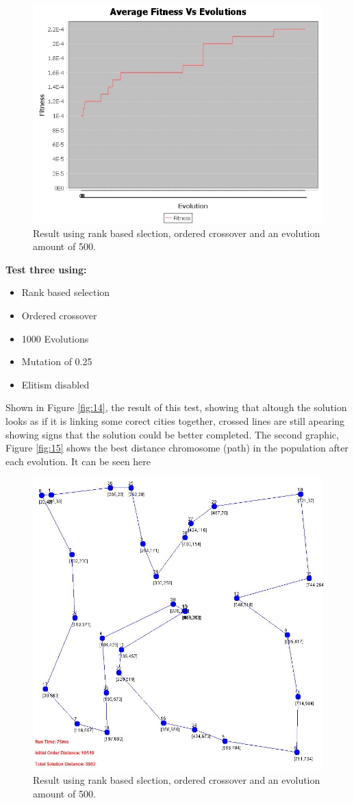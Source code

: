 \documentclass[article]{IEEEtran}
\begin{document}
\begin{figure}[H]
\centering
  \includegraphics[width=.8\linewidth]{images/averageFitnesses2}
  \caption{Result using rank based slection, ordered crossover and an evolution amount of 500.}
  \label{fig:17}
\end{figure}

\textbf{Test three using:} 
\begin{itemize}
\item Rank based selection
\item Ordered crossover
\item 1000 Evolutions
\item Mutation of 0.25
\item Elitism disabled
\end{itemize} 

Shown in Figure \ref{fig:14}, the result of this test, showing that altough the solution looks as if it is linking some corect cities together, crossed lines are still apearing showing signs that the solution could be better completed. The second graphic, Figure \ref{fig:15} shows the best distance chromosome (path) in the population after each evolution. It can be seen here 

\begin{figure}[H]
\centering
  \includegraphics[width=.8\linewidth]{images/test3}
  \caption{Result using rank based slection, ordered crossover and an evolution amount of 500.}
  \label{fig:18}
\end{figure}
\end{document}
